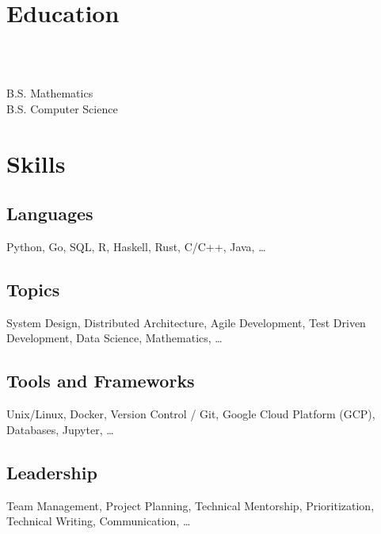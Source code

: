 \documentclass{tc_cv}
\begin{document}

\begin{minipage}[t]{0.3\linewidth}

  \vspace{2em}
  \section{Education}
  \\
  \date{Fall 2011 --- Spring 2016}\vspace{0.25em}\\
  \faGraduationCap \hspace{1ex} B.S. Mathematics\\
  \faGraduationCap \hspace{1ex} B.S. Computer Science

  \vspace{2em}
  \section{Skills}
  \subsection{Languages}
  Python,
  Go,
  SQL,
  R,
  Haskell,
  Rust,
  C/C++,
  Java,
  \ldots

  \subsection{Topics}
  System Design,
  Distributed Architecture,
  Agile Development,
  Test Driven Development,
  Data Science,
  Mathematics,
  \ldots

  \subsection{Tools and Frameworks}
  Unix/Linux,
  Docker,
  Version Control / Git,
  Google Cloud Platform (GCP),
  Databases,
  Jupyter,
  \ldots

  \subsection{Leadership}
  Team Management,
  Project Planning,
  Technical Mentorship,
  Prioritization,
  Technical Writing,
  Communication,
  \ldots


\end{minipage}
\end{document}

